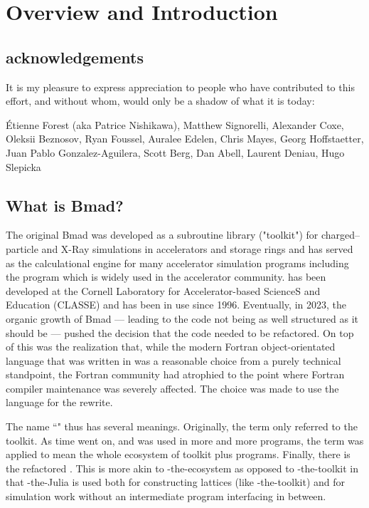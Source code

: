 \chapter{Overview and Introduction}

\section{acknowledgements}

It is my pleasure to express appreciation to people who have contributed to this effort, and without
whom, \bmadjl would only be a shadow of what it is today: 

\'Etienne Forest (aka Patrice Nishikawa),
Matthew Signorelli,
Alexander Coxe,
Oleksii Beznosov,
Ryan Foussel,
Auralee Edelen,
Chris Mayes,
Georg Hoffstaetter,
Juan Pablo Gonzalez-Aguilera,
Scott Berg,
Dan Abell,
Laurent Deniau,
Hugo Slepicka



\section{What is Bmad?}

The original Bmad was developed as a subroutine
library ("toolkit") for charged--particle and X-Ray simulations in accelerators and storage rings and 
has served as the calculational engine
for many accelerator simulation programs including the \tao program which is widely used in the
accelerator community. \bmad has
been developed at the Cornell Laboratory for Accelerator-based ScienceS and Education (CLASSE) and
has been in use since 1996.
Eventually, in 2023, the organic growth of Bmad --- leading to the code not being as well structured
as it should be --- pushed the decision that the code needed to be
refactored. On top of this was the realization that, while the modern Fortran object-orientated
language that \bmad was written in was a reasonable choice from a purely technical standpoint, 
the Fortran community had atrophied to the point where Fortran compiler maintenance was severely 
affected. The choice was made to use the \julia language for the rewrite.

The name ``\bmad" thus has several meanings. Originally, the term only referred to the \bmad
toolkit. As time went on, and \bmad was used in more and more programs, the term \bmad was
applied to mean the whole ecosystem of toolkit plus programs. Finally, there is the refactored \julia
\bmad. This \bmad is more akin to \bmad-the-ecosystem as
opposed to \bmad-the-toolkit in that \bmad-the-Julia is used both for constructing lattices
(like \bmad-the-toolkit) and for simulation work without an intermediate program interfacing in between.

